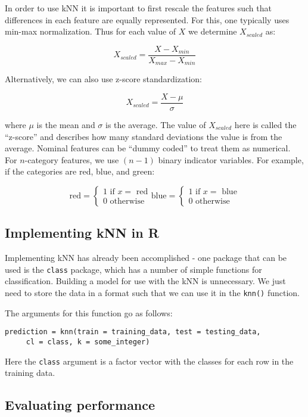 \documentclass[]{article}
\begin{document}
In order to use kNN it is important to first rescale the features such that differences in each feature are equally represented.  For this, one typically uses min-max normalization.  Thus for each value of $X$ we determine $X_{scaled}$ as:

$$
X_{scaled} = \frac{X-X_{min}}{X_{max}-X_{min}}
$$

Alternatively, we can also use z-score standardization:

$$
X_{scaled} = \frac{X-\mu}{\sigma}
$$

where $\mu$ is the mean and $\sigma$ is the average.  The value of $X_{scaled}$ here is called the ``z-score'' and describes how many standard deviations the value is from the average.
Nominal features can be ``dummy coded'' to treat them as numerical.  For $n$-category features, we use $(n-1)$ binary indicator variables.  For example, if the categories are red, blue, and green:

\begin{equation}
\text{red} =
\begin{cases}
	\text{1 if $x =$ red}\\
	\text{0 otherwise}
\end{cases}       
\text{blue} = 
\begin{cases}
	\text{1 if $x =$ blue}\\
	\text{0 otherwise}
\end{cases}
\end{equation}

\subsection{Implementing kNN in R}
Implementing kNN has already been accomplished - one package that can be used is the \verb|class| package, which has a number of simple functions for classification.  Building a model for use with the kNN is unnecessary.  We just need to store the data in a format such that we can use it in the \verb|knn()| function.

The arguments for this function go as follows:

\begin{verbatim}
prediction = knn(train = training_data, test = testing_data, 
     cl = class, k = some_integer)
\end{verbatim}

Here the \verb|class| argument is a factor vector with the classes for each row in the training data.

\subsection{Evaluating performance}
\end{document}
